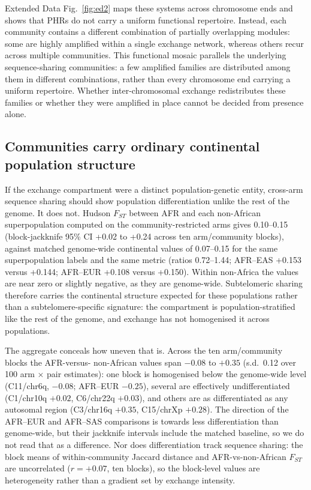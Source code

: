 \documentclass[pdflatex,mathphys]{jnl}
\begin{document}
Extended Data Fig.~\ref{fig:ed2} maps these systems across chromosome ends and
shows that PHRs do not carry a uniform functional repertoire. Instead, each
community contains a different combination of partially overlapping modules:
some are highly amplified within a single exchange network, whereas others
recur across multiple communities. This functional mosaic parallels the
underlying sequence-sharing communities: a few amplified families are distributed
among them in different combinations, rather than every chromosome end carrying a
uniform repertoire. Whether inter-chromosomal exchange redistributes these families
or whether they were amplified in place cannot be decided from presence alone.

\subsection*{Communities carry ordinary continental population structure}

If the exchange compartment were a distinct population-genetic entity, cross-arm sequence
sharing should show population differentiation unlike the rest of the genome. It does not.
Hudson $F_{ST}$ between AFR and each non-African superpopulation computed on the
community-restricted arms gives 0.10--0.15 (block-jackknife 95\% CI +0.02 to +0.24 across ten
arm/community blocks), against matched genome-wide continental values of 0.07--0.15 for the same
superpopulation labels and the same metric (ratios 0.72--1.44; AFR--EAS +0.153 versus +0.144;
AFR--EUR +0.108 versus +0.150). Within non-Africa the values are near zero or slightly negative,
as they are genome-wide. Subtelomeric sharing therefore carries the continental structure
expected for these populations rather than a subtelomere-specific signature: the compartment is
population-stratified like the rest of the genome, and exchange has not homogenised it across
populations.

The aggregate conceals how uneven that is. Across the ten arm/community blocks the AFR-versus-
non-African values span $-0.08$ to $+0.35$ (s.d.\ 0.12 over 100 arm $\times$ pair estimates):
one block is homogenised below the genome-wide level (C11/chr6q, $-0.08$; AFR--EUR $-0.25$),
several are effectively undifferentiated (C1/chr10q $+0.02$, C6/chr22q $+0.03$), and others are
as differentiated as any autosomal region (C3/chr16q $+0.35$, C15/chrXp $+0.28$). The direction
of the AFR--EUR and AFR--SAS comparisons is towards less differentiation than genome-wide, but
their jackknife intervals include the matched baseline, so we do not read that as a difference.
Nor does differentiation track sequence sharing: the block means of within-community Jaccard
distance and AFR-vs-non-African $F_{ST}$ are uncorrelated ($r = +0.07$, ten blocks), so the
block-level values are heterogeneity rather than a gradient set by exchange intensity.
\end{document}
